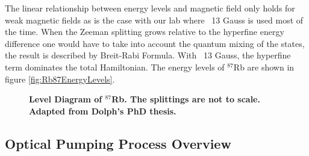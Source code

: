 The linear relationship between energy levels and magnetic field only holds for weak magnetic fields as is the case with our lab where ~13 Gauss is used most of the time. When the Zeeman splitting grows relative to the hyperfine energy difference one would have to take into account the quantum mixing of the states, the result is described by Breit-Rabi Formula. With ~13 Gauss, the hyperfine term dominates the total Hamiltonian. The energy levels of $^{87}$Rb are shown in figure \ref{fig:Rb87EnergyLevels}.

\begin{figure}[H]
	\centering
	\caption{{\bf Level Diagram of $^{87}$Rb. The splittings are not to scale. Adapted from Dolph's PhD thesis.}}
	\label{fig:Rb87Energylevels}
\end{figure}

\subsection{Optical Pumping Process Overview}


